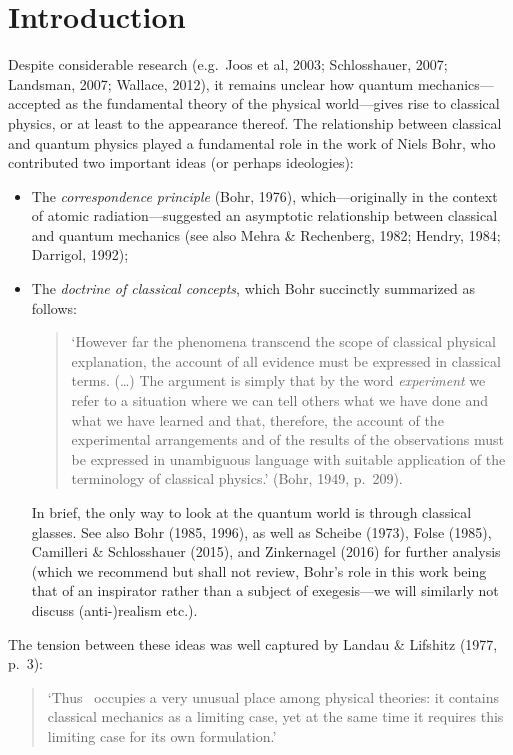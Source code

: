 \documentclass[12pt]{article}
\begin{document}
\section{Introduction}\label{sec1}
Despite considerable research (e.g.\ Joos et al, 2003; Schlosshauer, 2007; Landsman, 2007; Wallace, 2012), it remains  unclear how
quantum mechanics---accepted as the fundamental theory of the physical world---gives rise to  classical physics, or at least to the appearance thereof. The relationship between classical and quantum physics played a fundamental role in the work of Niels Bohr, who contributed two important ideas (or perhaps ideologies):
\begin{itemize}
\item The  \emph{correspondence principle} (Bohr, 1976),  which---originally in the context of atomic radiation---suggested an asymptotic relationship between classical and quantum mechanics (see also Mehra \& Rechenberg, 1982;  Hendry, 1984; Darrigol, 1992);
\item The \emph{doctrine of classical concepts}, which Bohr succinctly summarized  as follows:
 \begin{quotation}
 `However far the phenomena transcend the scope of classical physical explanation, the account of all evidence must be expressed in classical terms. (\ldots) The argument is simply that by the word \emph{experiment} we refer to a situation where we can tell others what we have done and what we have learned and that, therefore, the account of the experimental arrangements and of the results of the observations must be expressed in unambiguous language with suitable application of the terminology of classical physics.' (Bohr, 1949, p.\ 209). 
\end{quotation}
In brief, the only way to look at the quantum world is through classical glasses. 
See also Bohr (1985, 1996), as well as Scheibe (1973), Folse (1985),  Camilleri \& Schlosshauer (2015), and Zinkernagel (2016) for further analysis  (which we recommend but shall not review, Bohr's role in this work being that of an inspirator rather than a subject of exegesis---we will similarly not discuss (anti-)realism etc.). 
\end{itemize}
The tension between these ideas was  well  captured by Landau \& Lifshitz (1977, p.\ 3):
 \begin{quotation}
`Thus \qm\ occupies a very unusual place among physical theories: it contains classical mechanics as a limiting case, yet at the same time it requires this limiting case for its own formulation.' 
\end{quotation} 
\end{document}
